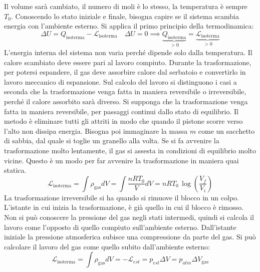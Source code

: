 \documentclass[10pt,a4paper]{book}
\begin{document}
\begin{figure}[htpb]
\end{figure}
\FloatBarrier
Il volume sarà cambiato, il numero di moli è lo stesso, la temperatura è sempre $T_0$. Conoscendo lo stato iniziale e finale, bisogna capire se il sistema scambia energia con l'ambiente esterno. Si applica il primo principio della termodinamica:
\[
	\Delta U = Q_{\text{isoterma} }- \mathcal{L}_{\text{isoterma} } \quad \Delta U = 0 \implies \underbrace{Q_{\text{isoterma} }}_{>0} = \underbrace{\mathcal{L}_{\text{isoterma} }}_{>0}
\]
L'energia interna del sistema non varia perché dipende solo dalla temperatura. Il calore scambiato deve essere pari al lavoro compiuto. Durante la trasformazione, per potersi espandere, il gas deve assorbire calore dal serbatoio e convertirlo in lavoro meccanico di espansione. Sul calcolo del lavoro si distinguono i casi a seconda che la trasformazione venga fatta in maniera reversibile o irreversibile, perché il calore assorbito sarà diverso.
Si supponga che la trasformazione venga fatta in maniera reversibile, per passaggi continui dallo stato di equilibrio. Il metodo è eliminare tutti gli attriti in modo che quando il pistone scorre verso l'alto non dissipa energia. Bisogna poi immaginare la massa $m$ come un sacchetto di sabbia, dal quale si toglie un granello alla volta. Se si fa avvenire la trasformazione molto lentamente, il gas si assesta in condizioni di equilibrio molto vicine. Questo è un modo per far avvenire la trasformazione in maniera quai statica.
\[
	\mathcal{L}_{\text{isoterma} }= \int\rho_{\text{gas} }dV = \int \frac{nRT_0 }{V}dV = nRT_0\,\log \left( \frac{V_f}{V_i} \right)
\]
La trasformazione irreversibile si ha quando si rimuove il blocco in un colpo. L'istante in cui inizia la trasformazione, è già quello in cui il blocco è rimosso. Non si può conoscere la pressione del gas negli stati intermedi, quindi si calcola il lavoro come l'opposto di quello compiuto sull'ambiente esterno. Dall'istante iniziale la pressione atmosferica subisce una compressione da parte del gas. Si può calcolare il lavoro del gas come quello subito dall'ambiente esterno:
\[
	\mathcal{L}_{\text{isoterma} } =\int \rho_{\text{gas} }dV = -\mathcal{L}_{est} = p_{est}\Delta V = p_{atm}\Delta V_{\text{gas} }    	
\]
\end{document}
